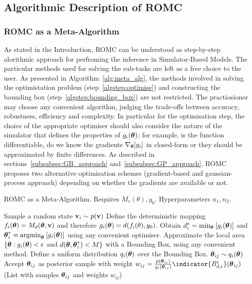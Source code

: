 \subsection{Algorithmic Description of ROMC}

\subsubsection{ROMC as a Meta-Algorithm}

As stated in the Introduction, ROMC can be understood as step-by-step alorithmic approach for perfroming the inference in Simulator-Based Models. The particular methods used for solving the sub-tasks are left as a free choice to the user. As presented in Algorithm~\ref{alg:meta_alg}, the methods involved in solving the optimistation problem (step~\ref{algstep:optimise}) and constructing the bounding box (step~\ref{algstep:bounding_box}) are not restricted. The practiosioner may choose any convenient algorithm, judging the trade-offs between accuracy, robustness, efficiency and complexity. In particular for the optimisation step, the choice of the appropriate optimiser should also consider the nature of the simulator that defines the properties of $g_i(\boldsymbol{\theta})$; for example, is the function differentiable, do we know the gradients $\nabla_{\boldsymbol{\theta}} [g_i] $ in closed-form or they should be approximated by finite differences. As described in sections~\ref{subsubsec:GB_approach} and~\ref{subsubsec:GP_approach}, ROMC proposes two alternative optimisation schemes (gradient-based and gaussian-process approach) depending on whether the gradients are available or not.

\begin{algorithm}[t]
	\caption{ROMC as a Meta-Algorithm. Requires $M_r(\theta), y_0$. Hyperparameters $n_1,n_2$.}\label{alg:meta_alg}
	\begin{algorithmic}[1]
    \State Sample a random state $\mathbf{v}_i \sim p(\mathbf{v})$
		\State Define the deterministic mapping $f_i(\boldsymbol{\theta}) = M_d(\boldsymbol{\theta}, \mathbf{v})$ and therefore $g_i(\boldsymbol{\theta}) = d(f_i(\theta), y_0)$.
    \State Obtain $d_i^* = \text{min}_{\boldsymbol{\theta}} \: [g_i(\boldsymbol{\theta})]$ and $\boldsymbol{\theta}_i^* = \text{argmin}_{\boldsymbol{\theta}}\: [g_i(\boldsymbol{\theta})]$ using any convenient optimiser. \label{algstep:optimise}
    \State Approximate the local area $\{ \boldsymbol{\theta} : g_i(\boldsymbol{\theta}) < \epsilon$ and $d(\boldsymbol{\theta}, \boldsymbol{\theta}_i^*) < M \}$ with a Bounding Box, using any convenient method. \label{algstep:bounding_box}
		\State Define a uniform distribution $q_i(\boldsymbol{\theta})$ over the Bounding Box.
			\State $\boldsymbol{\theta}_{ij} \sim q_i(\boldsymbol{\theta})$
			\State Accept $\boldsymbol{\theta}_{ij}$ as posterior sample with weight $w_{ij} = \frac{p(\thetabij)}{q_i(\thetabij)} \indicator{\regioni} (\thetabij)$
			\EndFor
      \EndFor
     \Return(List with samples $\boldsymbol{\theta}_{ij}$ and weights $w_{ij}$) 
	\end{algorithmic}
\end{algorithm}


